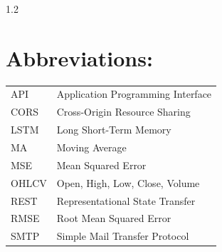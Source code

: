 \documentclass[12pt, a4paper]{report}
\begin{document}
\begin{spacing}{1.2}
\section*{Abbreviations:}
\begin{longtable}{lp{9.3cm}}
    API & Application Programming Interface\\
    CORS & Cross-Origin Resource Sharing\\
    LSTM & Long Short-Term Memory\\
    MA & Moving Average\\
    MSE & Mean Squared Error\\
    OHLCV & Open, High, Low, Close, Volume\\
    REST & Representational State Transfer\\
    RMSE & Root Mean Squared Error\\
    SMTP & Simple Mail Transfer Protocol\\
\end{longtable}

\newpage

\end{spacing}
\end{document}
